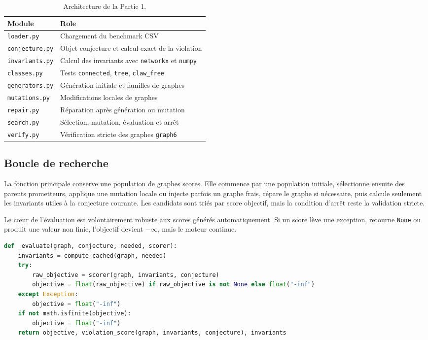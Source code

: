 \documentclass[11pt,a4paper]{article}
\begin{document}
\begin{table}[H]
\centering
\begin{tabular}{ll}
\toprule
Module & Role \\
\midrule
\texttt{loader.py} & Chargement du benchmark CSV \\
\texttt{conjecture.py} & Objet conjecture et calcul exact de la violation \\
\texttt{invariants.py} & Calcul des invariants avec \texttt{networkx} et \texttt{numpy} \\
\texttt{classes.py} & Tests \texttt{connected}, \texttt{tree}, \texttt{claw\_free} \\
\texttt{generators.py} & Génération initiale et familles de graphes \\
\texttt{mutations.py} & Modifications locales de graphes \\
\texttt{repair.py} & Réparation après génération ou mutation \\
\texttt{search.py} & Sélection, mutation, évaluation et arrêt \\
\texttt{verify.py} & Vérification stricte des graphes \texttt{graph6} \\
\bottomrule
\end{tabular}
\caption{Architecture de la Partie 1.}
\end{table}

\subsection{Boucle de recherche}

La fonction principale conserve une population de graphes scores. Elle commence par une population initiale, sélectionne ensuite des parents prometteurs, applique une mutation locale ou injecte parfois un graphe frais, répare le graphe si nécessaire, puis calcule seulement les invariants utiles à la conjecture courante. Les candidats sont triés par score objectif, mais la condition d'arrêt reste la validation stricte.

Le cœur de l'évaluation est volontairement robuste aux scores générés automatiquement. Si un score lève une exception, retourne \texttt{None} ou produit une valeur non finie, l'objectif devient \(-\infty\), mais le moteur continue.

\begin{lstlisting}[language=Python,caption={Evaluation d'un candidat dans le moteur de recherche.}]
def _evaluate(graph, conjecture, needed, scorer):
    invariants = compute_cached(graph, needed)
    try:
        raw_objective = scorer(graph, invariants, conjecture)
        objective = float(raw_objective) if raw_objective is not None else float("-inf")
    except Exception:
        objective = float("-inf")
    if not math.isfinite(objective):
        objective = float("-inf")
    return objective, violation_score(graph, invariants, conjecture), invariants
\end{lstlisting}
\end{document}
